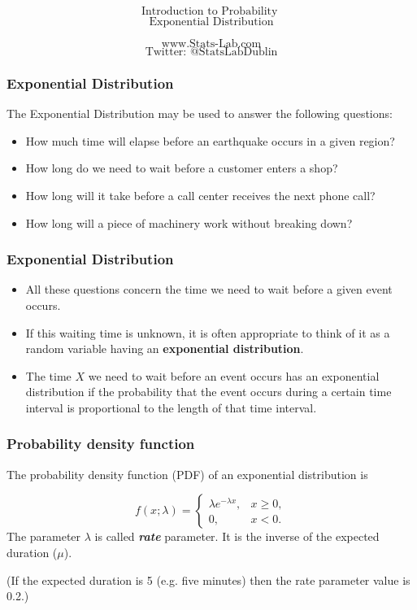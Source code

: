 \documentclass{beamer}
\begin{document}
\begin{frame}
\Huge
\[\mbox{Introduction to Probability }\]
\huge
\[\mbox{Exponential Distribution}\]

\Large
\[\mbox{www.Stats-Lab.com}\]
\[\mbox{Twitter: @StatsLabDublin}\]
\end{frame}


\begin{frame}[fragile]
\frametitle{Exponential Distribution}
\Large
The Exponential Distribution may be used to answer the following questions:
\begin{itemize}
\item How much time will elapse before an earthquake occurs in a given region?
\item How long do we need to wait before a customer enters a shop?
\item How long will it take before a call center receives the next phone call?
\item How long will a piece of machinery work without breaking down?
\end{itemize}
\end{frame}

\begin{frame}[fragile]
\frametitle{Exponential Distribution}
\Large
\begin{itemize}
\item All these questions concern the time we need to wait before a given event occurs. 
\item If this waiting time is unknown, it is often appropriate to think of it as a random variable having an \textbf{exponential distribution}.
\item The time $X$ we need to wait before an event occurs has an exponential distribution if the probability that the event occurs during a certain time interval is proportional to the length of that time interval.

\end{itemize}
\end{frame}

\begin{frame}[fragile]
\frametitle{Probability density function}
\Large
The probability density function (PDF) of an exponential distribution is

\[
f(x;\lambda) = \begin{cases}
\lambda e^{-\lambda x}, & x \ge 0, \\
0, & x < 0.
\end{cases}\]
The parameter $\lambda$  is called \textbf{\emph{rate}} parameter. It is the inverse of the expected duration ($\mu$).\\ \bigskip

(If the expected duration is 5 (e.g. five minutes) then the rate parameter value is 0.2.)
\end{frame}
\end{document}
